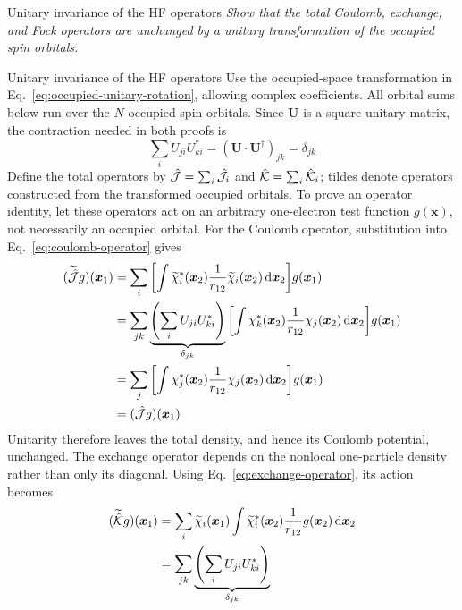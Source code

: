 \documentclass[11pt,a4paper,titlepage]{article}
\numberwithin{equation}{section}
\newcommand{\bx}{\boldsymbol{x}}
\newcommand{\bU}{\boldsymbol{U}}
\newcommand{\chJ}{\Hat{\mathcal{J}}}
\newcommand{\chK}{\Hat{\mathcal{K}}}
\newcommand{\violet}[1]{\textcolor{hfViolet}{#1}}
\begin{document}
\begin{hfexercise}[phantom={\label{ex:operator-unitary-invariance}}]{Unitary invariance of the HF operators}
\violet{\textit{Show that the total Coulomb, exchange, and Fock operators
are unchanged by a unitary transformation of the occupied spin orbitals.}}
\end{hfexercise}
\begin{hfsolution}{Unitary invariance of the HF operators}
Use the occupied-space transformation in
Eq.~\eqref{eq:occupied-unitary-rotation}, allowing complex coefficients.
All orbital sums below run over the $N$ occupied spin orbitals. Since
$\bU$ is a square unitary matrix, the contraction needed in both proofs is
\begin{equation}
  \sum_i U_{ji}U_{ki}^*
  =(\bU\cdot\bU^\dag)_{jk}
  =\delta_{jk}
\end{equation}
Define the total operators by $\chJ=\sum_i\chJ_i$ and
$\chK=\sum_i\chK_i$; tildes denote operators constructed from the
transformed occupied orbitals. To prove an operator identity, let these
operators act on an arbitrary one-electron test function $g(\bx)$, not
necessarily an occupied orbital.
For the Coulomb operator, substitution into
Eq.~\eqref{eq:coulomb-operator} gives
\begin{equation}
\begin{split}
  (\widetilde{\chJ}g)(\bx_1)
  &=\sum_i\qty[\int
    \widetilde{\chi}_i^*(\bx_2)\frac{1}{r_{12}}
    \widetilde{\chi}_i(\bx_2)\dd{\bx_2}]g(\bx_1)\\
  &=\sum_{jk}\underbrace{\qty(\sum_iU_{ji}U_{ki}^*)}_{\delta_{jk}}
    \qty[\int\chi_k^*(\bx_2)\frac{1}{r_{12}}
      \chi_j(\bx_2)\dd{\bx_2}]g(\bx_1)\\
  &=\sum_j\qty[\int\chi_j^*(\bx_2)\frac{1}{r_{12}}
      \chi_j(\bx_2)\dd{\bx_2}]g(\bx_1)\\
  &=(\chJ g)(\bx_1)
\end{split}
\end{equation}
Unitarity therefore leaves the total density, and hence its Coulomb
potential, unchanged. The exchange operator depends on the nonlocal
one-particle density rather than only its diagonal. Using
Eq.~\eqref{eq:exchange-operator}, its action becomes
\begin{equation}
\begin{split}
  (\widetilde{\chK}g)(\bx_1)
  &=\sum_i\widetilde{\chi}_i(\bx_1)
    \int\widetilde{\chi}_i^*(\bx_2)\frac{1}{r_{12}}
      g(\bx_2)\dd{\bx_2}\\
  &=\sum_{jk}\underbrace{\qty(\sum_iU_{ji}U_{ki}^*)}_{\delta_{jk}}

\end{split}
\end{equation}
\end{hfsolution}
\end{document}
